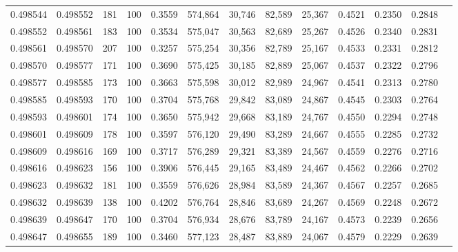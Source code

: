 \begin{tabular}{rrrrrrrrrrrrr}
0.498544 & 0.498552 &   181 & 100 &                                     0.3559 & 574,864 &  30,746 &  82,589 &  25,367 & 0.4521 & 0.2350 & 0.2848 \\
0.498552 & 0.498561 &   183 & 100 &                                     0.3534 & 575,047 &  30,563 &  82,689 &  25,267 & 0.4526 & 0.2340 & 0.2831 \\
0.498561 & 0.498570 &   207 & 100 &                                     0.3257 & 575,254 &  30,356 &  82,789 &  25,167 & 0.4533 & 0.2331 & 0.2812 \\
0.498570 & 0.498577 &   171 & 100 &                                     0.3690 & 575,425 &  30,185 &  82,889 &  25,067 & 0.4537 & 0.2322 & 0.2796 \\
0.498577 & 0.498585 &   173 & 100 &                                     0.3663 & 575,598 &  30,012 &  82,989 &  24,967 & 0.4541 & 0.2313 & 0.2780 \\
0.498585 & 0.498593 &   170 & 100 &                                     0.3704 & 575,768 &  29,842 &  83,089 &  24,867 & 0.4545 & 0.2303 & 0.2764 \\
0.498593 & 0.498601 &   174 & 100 &                                     0.3650 & 575,942 &  29,668 &  83,189 &  24,767 & 0.4550 & 0.2294 & 0.2748 \\
0.498601 & 0.498609 &   178 & 100 &                                     0.3597 & 576,120 &  29,490 &  83,289 &  24,667 & 0.4555 & 0.2285 & 0.2732 \\
0.498609 & 0.498616 &   169 & 100 &                                     0.3717 & 576,289 &  29,321 &  83,389 &  24,567 & 0.4559 & 0.2276 & 0.2716 \\
0.498616 & 0.498623 &   156 & 100 &                                     0.3906 & 576,445 &  29,165 &  83,489 &  24,467 & 0.4562 & 0.2266 & 0.2702 \\
0.498623 & 0.498632 &   181 & 100 &                                     0.3559 & 576,626 &  28,984 &  83,589 &  24,367 & 0.4567 & 0.2257 & 0.2685 \\
0.498632 & 0.498639 &   138 & 100 &                                     0.4202 & 576,764 &  28,846 &  83,689 &  24,267 & 0.4569 & 0.2248 & 0.2672 \\
0.498639 & 0.498647 &   170 & 100 &                                     0.3704 & 576,934 &  28,676 &  83,789 &  24,167 & 0.4573 & 0.2239 & 0.2656 \\
0.498647 & 0.498655 &   189 & 100 &                                     0.3460 & 577,123 &  28,487 &  83,889 &  24,067 & 0.4579 & 0.2229 & 0.2639 \\

\end{tabular}
